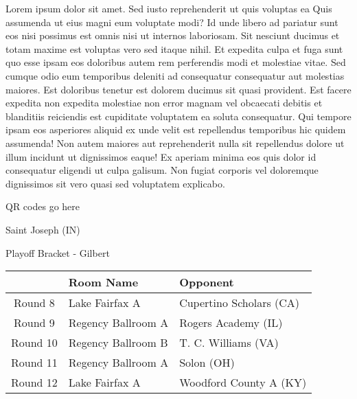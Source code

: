 \documentclass{article}%
\begin{document}
\vspace*{8pt}%
\linebreak%
\newline%
\newline%
Lorem ipsum dolor sit amet. Sed iusto reprehenderit ut quis voluptas ea Quis assumenda ut eius magni eum voluptate modi? Id unde libero ad pariatur sunt eos nisi possimus est omnis nisi ut internos laboriosam. Sit nesciunt ducimus et totam maxime est voluptas vero sed itaque nihil. Et expedita culpa et fuga sunt quo esse ipsam eos doloribus autem rem perferendis modi et molestiae vitae.\newline%
\newline%
Sed cumque odio eum temporibus deleniti ad consequatur consequatur aut molestias maiores. Est doloribus tenetur est dolorem ducimus sit quasi provident. Est facere expedita non expedita molestiae non error magnam vel obcaecati debitis et blanditiis reiciendis est cupiditate voluptatem ea soluta consequatur. Qui tempore ipsam eos asperiores aliquid ex unde velit est repellendus temporibus hic quidem assumenda!\newline%
\newline%
Non autem maiores aut reprehenderit nulla sit repellendus dolore ut illum incidunt ut dignissimos eaque! Ex aperiam minima eos quis dolor id consequatur eligendi ut culpa galisum. Non fugiat corporis vel doloremque dignissimos sit vero quasi sed voluptatem explicabo.\newline%
\newline%
%
\vspace*{30pt}%
\begin{center}%
\begin{Huge}%
QR codes go here%
\end{Huge}%
\end{center}%
\newpage%
\begin{center}%
\begin{Huge}%
Saint Joseph (IN)%
\end{Huge}%
\vspace*{8pt}%
\linebreak%
\begin{Large}%
Playoff Bracket {-} Gilbert%
\end{Large}%
\end{center}%
%
\begin{tabularx}{\textwidth}{|c|Y|Y|}%
\hline%
&Room Name&Opponent\\%
\hline%
Round 8&Lake Fairfax A&Cupertino Scholars (CA)\\%
Round 9&Regency Ballroom A&Rogers Academy (IL)\\%
Round 10&Regency Ballroom B&T. C. Williams (VA)\\%
Round 11&Regency Ballroom A&Solon (OH)\\%
Round 12&Lake Fairfax A&Woodford County A (KY)\\%
\hline%
\end{tabularx}%
\end{document}
